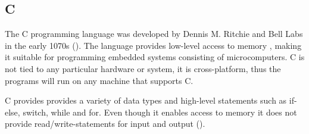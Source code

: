 \subsection{C}
The C programming language was developed by Dennis M. Ritchie and Bell Labs in the early 1070s (\cite{clanguage}). The language provides low-level access to memory , making it suitable for programming embedded systems consisting of microcomputers. C is not tied to any particular hardware or system, it is cross-platform, thus the programs will run on any machine that supports C.

C provides provides a variety of data types and high-level statements such as if-else, switch, while and for. Even though it enables access to memory it does not provide read/write-statements for input and output (\cite{cproglang}). 